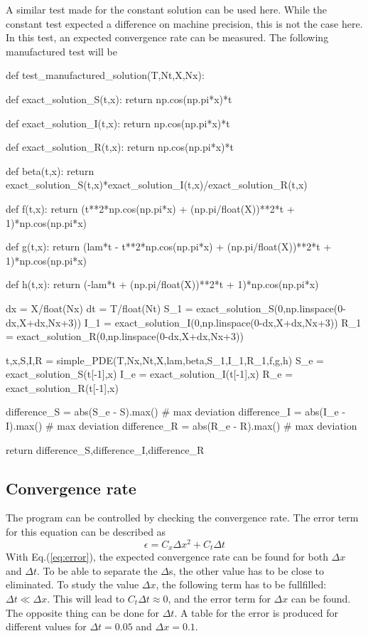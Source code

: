\documentclass[%
twoside,                 %
final,                   %
chapterprefix=true,      %
open=right               %
10pt]{book}
\begin{document}
A similar test made for the constant solution can be used here. While the constant test expected a difference on machine precision, this is not the case here. In this test, an expected convergence rate can be measured. The following manufactured test will be

\bpycod
def test_manufactured_solution(T,Nt,X,Nx):
    
    def exact_solution_S(t,x):
        return np.cos(np.pi*x)*t

    def exact_solution_I(t,x):
        return np.cos(np.pi*x)*t

    def exact_solution_R(t,x):
        return np.cos(np.pi*x)*t


    def beta(t,x):
        return exact_solution_S(t,x)*exact_solution_I(t,x)/exact_solution_R(t,x)
   
    def f(t,x):
        return (t**2*np.cos(np.pi*x) + (np.pi/float(X))**2*t + 1)*np.cos(np.pi*x) 

    def g(t,x):
        return (lam*t - t**2*np.cos(np.pi*x) + (np.pi/float(X))**2*t + 1)*np.cos(np.pi*x)

    def h(t,x):
        return (-lam*t + (np.pi/float(X))**2*t + 1)*np.cos(np.pi*x)
        

    dx = X/float(Nx)
    dt = T/float(Nt)
    S_1 = exact_solution_S(0,np.linspace(0-dx,X+dx,Nx+3))
    I_1 = exact_solution_I(0,np.linspace(0-dx,X+dx,Nx+3))
    R_1 = exact_solution_R(0,np.linspace(0-dx,X+dx,Nx+3))
     
    t,x,S,I,R = simple_PDE(T,Nx,Nt,X,lam,beta,S_1,I_1,R_1,f,g,h)
    S_e = exact_solution_S(t[-1],x)
    I_e = exact_solution_I(t[-1],x)
    R_e = exact_solution_R(t[-1],x)
    
    difference_S = abs(S_e - S).max()  # max deviation
    difference_I = abs(I_e - I).max()  # max deviation
    difference_R = abs(R_e - R).max()  # max deviation

    return difference_S,difference_I,difference_R
\epycod

\subsection{Convergence rate}
The program can be controlled by checking the convergence rate. The error term  for this equation can be described as  
\begin{equation} \label{eq:error}
    \epsilon = C_x\Delta x^2 + C_t \Delta t
\end{equation}
With Eq.(\ref{eq:error}), the expected convergence rate can be found for both $\Delta x$ and $\Delta t$. To be able to separate the $\Delta$s, the other value has to be close to eliminated. To study the value $\Delta x$, the following term has to be fullfilled: $\Delta t \ll \Delta x$. This will lead to $C_t\Delta t \approx 0$, and the error term for $\Delta x$ can be found. The opposite thing can  be done for $\Delta t$. A table for the error is produced for different values for $\Delta t = 0.05$ and $\Delta x=0.1$.
\end{document}
